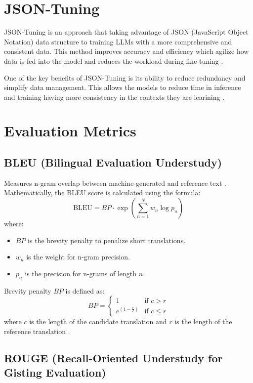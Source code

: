 \section{JSON-Tuning}

JSON-Tuning is an approach that taking advantage of JSON (JavaScript Object Notation) data structure to training LLMs with a more comprehensive and consistent data. This method improves accuracy and efficiency which agilize how data is fed into the model and reduces the workload during fine-tuning \citep{zheng2024llamafactory}.

One of the key benefits of JSON-Tuning is its ability to reduce redundancy and simplify data management. This allows the models to reduce time in inference and training having more consistency in the contexts they are learining \citep{gao2024jsontuning}. 

\section{Evaluation Metrics}
\subsection{BLEU (Bilingual Evaluation Understudy)}

Measures n-gram overlap between machine-generated and reference text \citep{Reiter2018A}. Mathematically, the BLEU score is calculated using the formula:
\[
\text{BLEU} = BP \cdot \exp \left( \sum_{n=1}^{N} w_n \log p_n \right)
\]
where:
\begin{itemize}
    \item \( BP \) is the brevity penalty to penalize short translations.
    \item \( w_n \) is the weight for n-gram precision.
    \item \( p_n \) is the precision for n-grams of length \( n \).
\end{itemize}

Brevity penalty \( BP \) is defined as:
\[
BP = 
\begin{cases} 
1 & \text{if } c > r \\
e^{(1-\frac{r}{c})} & \text{if } c \leq r 
\end{cases}
\]
where \( c \) is the length of the candidate translation and \( r \) is the length of the reference translation \citep{Reiter2018A}.

\subsection{ROUGE (Recall-Oriented Understudy for Gisting Evaluation)} 


